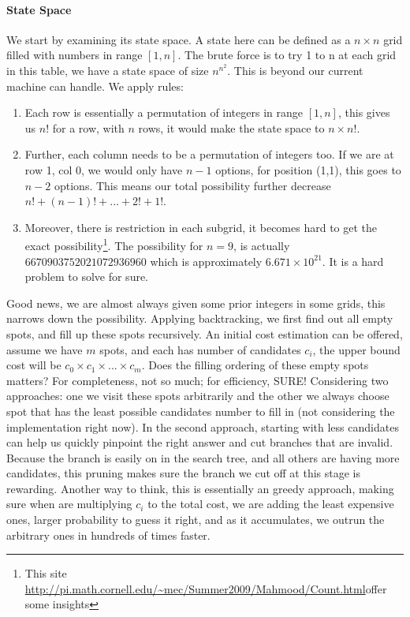 \documentclass[../main.tex]{subfiles}
\begin{document}
\paragraph{State Space} We start by examining its state space. A state here can be defined as a $n\times n$ grid filled with numbers in range $[1,n]$. The brute force is to try 1 to n at each grid in this table, we have a state space of size $n^{n^2}$. This is beyond our current machine can handle. We apply rules: 
\begin{enumerate}
    \item Each row is essentially a permutation of integers in range $[1,n]$, this gives us $n!$ for a row, with $n$ rows, it would make the state space to $n\times n!$. 
    \item Further, each column needs to be a permutation of integers too. If we are at row 1, col 0, we would only have $n-1$ options, for position (1,1), this goes to $n-2$ options. This means our total possibility further decrease $n!+(n-1)!+...+2!+1!$. 
    \item Moreover, there is restriction in each subgrid, it becomes hard to get the exact possibility\footnote{This site \url{http://pi.math.cornell.edu/~mec/Summer2009/Mahmood/Count.html}offer some insights}. The possibility for $n=9$, is  actually  $6670903752021072936960$ which is approximately $6.671\times 10^{21}$. It is a hard problem to solve for sure. 
\end{enumerate}

 Good news, we are almost always given some prior integers in some grids, this narrows down the possibility. Applying backtracking, we first find out all empty spots, and fill up these spots recursively. An initial cost estimation can be offered, assume we have $m$ spots, and each has number of candidates $c_i$, the upper bound cost will be $c_0\times c_1\times...\times c_m$. Does the filling ordering of these empty spots matters?  For completeness, not so much; for efficiency, SURE!  Considering two approaches: one we visit these spots arbitrarily and the other we always choose spot that has the least possible candidates number to fill in (not considering the implementation right now). In the second approach, starting with less candidates can help us quickly pinpoint the right answer and cut branches that are invalid. Because the branch is easily on in the search tree, and all others are having more candidates, this pruning makes sure the branch we cut off at this stage is rewarding. Another way to think, this is essentially an greedy approach, making sure when are multiplying $c_i$ to the total cost, we are adding the least expensive ones, larger probability to guess it right, and as it accumulates, we outrun the arbitrary ones in hundreds of times faster.
 
\end{document}
